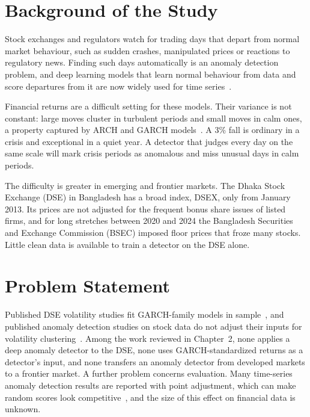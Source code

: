 
\section{Background of the Study}
Stock exchanges and regulators watch for trading days that depart from normal market
behaviour, such as sudden crashes, manipulated prices or reactions to regulatory news.
Finding such days automatically is an anomaly detection problem, and deep learning models
that learn normal behaviour from data and score departures from it are now widely used for
time series~\cite{malhotra2016lstm,hundman2018detecting,xu2018unsupervised}.

Financial returns are a difficult setting for these models. Their variance is not constant:
large moves cluster in turbulent periods and small moves in calm ones, a property captured
by ARCH and GARCH models~\cite{engle1982autoregressive,bollerslev1986generalized}. A 3\%
fall is ordinary in a crisis and exceptional in a quiet year. A detector that judges every
day on the same scale will mark crisis periods as anomalous and miss unusual days in calm
periods.

The difficulty is greater in emerging and frontier markets. The Dhaka Stock Exchange (DSE)
in Bangladesh has a broad index, DSEX, only from January 2013. Its prices are not adjusted
for the frequent bonus share issues of listed firms, and for long stretches between 2020 and
2024 the Bangladesh Securities and Exchange Commission (BSEC) imposed floor prices that froze
many stocks. Little clean data is available to train a detector on the DSE alone.

\section{Problem Statement}
Published DSE volatility studies fit GARCH-family models in
sample~\cite{siddikee2016volatility,haque2021modeling}, and published anomaly detection
studies on stock data do not adjust their inputs for volatility
clustering~\cite{golmohammadi2015time,mariani2021autoencoder}. Among the work reviewed in
Chapter~2, none applies a deep anomaly detector to the DSE, none uses GARCH-standardized
returns as a detector's input, and none transfers an anomaly detector from developed markets
to a frontier market. A further problem concerns evaluation. Many time-series anomaly
detection results are reported with point adjustment, which can make random scores look
competitive~\cite{kim2022towards}, and the size of this effect on financial data is unknown.

